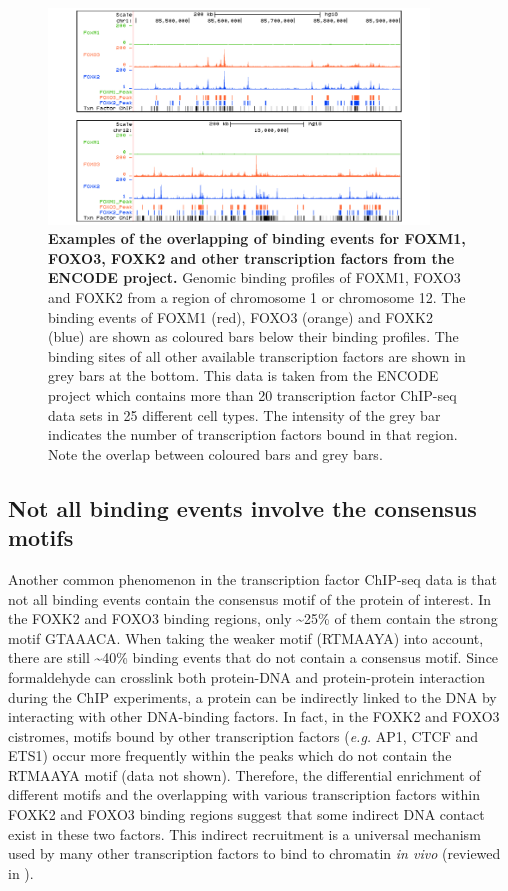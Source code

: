 \begin{figure}[!h]
    \centering
    \includegraphics[width=0.9\textwidth]{chapter4/figures/fig52.pdf}
    \caption[Examples of the overlapping of binding events for FOXM1, FOXO3, FOXK2 and other transcription factors from the ENCODE project]{\textbf{Examples of the overlapping of binding events for FOXM1, FOXO3, FOXK2 and other transcription factors from the ENCODE project.} Genomic binding profiles of FOXM1, FOXO3 and FOXK2 from a region of chromosome 1 or chromosome 12. The binding events of FOXM1 (red), FOXO3 (orange) and FOXK2 (blue) are shown as coloured bars below their binding profiles. The binding sites of all other available transcription factors are shown in grey bars at the bottom. This data is taken from the ENCODE project which contains more than 20 transcription factor ChIP-seq data sets in 25 different cell types. The intensity of the grey bar indicates the number of transcription factors bound in that region. Note the overlap between coloured bars and grey bars.}
    \label{fig:fig52}
\end{figure}

\subsection{Not all binding events involve the consensus motifs}

Another common phenomenon in the transcription factor ChIP-seq data is that not all binding events contain the consensus motif of the protein of interest. In the FOXK2 and FOXO3 binding regions, only \textasciitilde 25\% of them contain the strong motif GTAAACA. When taking the weaker motif (RTMAAYA) into account, there are still \textasciitilde 40\% binding events that do not contain a consensus motif. Since formaldehyde can crosslink both protein-DNA and protein-protein interaction during the ChIP experiments, a protein can be indirectly linked to the DNA by interacting with other DNA-binding factors. In fact, in the FOXK2 and FOXO3 cistromes, motifs bound by other transcription factors (\textit{e.g.} AP1, CTCF and ETS1) occur more frequently within the peaks which do not contain the RTMAAYA motif (data not shown). Therefore, the differential enrichment of different motifs and the overlapping with various transcription factors within FOXK2 and FOXO3 binding regions suggest that some indirect DNA contact exist in these two factors. This indirect recruitment is a universal mechanism used by many other transcription factors to bind to chromatin \textit{in vivo} (reviewed in \cite{farnham2009insights}).

